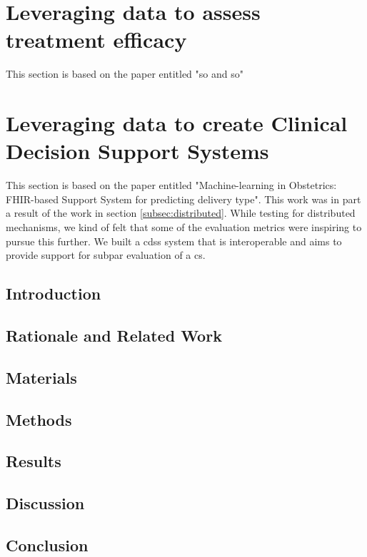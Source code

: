 \section{Leveraging data to assess treatment efficacy}\label{subsec:ipop}
This section is based on the paper entitled "so and so"

%

\section{Leveraging data to create Clinical Decision Support Systems}\label{subsec:obs}
This section is based on the paper entitled "Machine-learning in Obstetrics: FHIR-based Support System for predicting delivery type". This work was in part a result of the work in section \ref{subsec:distributed}. While testing for distributed mechanisms, we kind of felt that some of the evaluation metrics were inspiring to pursue this further. We built a \ac{cdss} system that is interoperable and aims to provide support for subpar evaluation of a \ac{cs}.

\subsection{Introduction}

\subsection{Rationale and Related Work}

\subsection{Materials}

\subsection{Methods}

\subsection{Results}

\subsection{Discussion}

\subsection{Conclusion}






